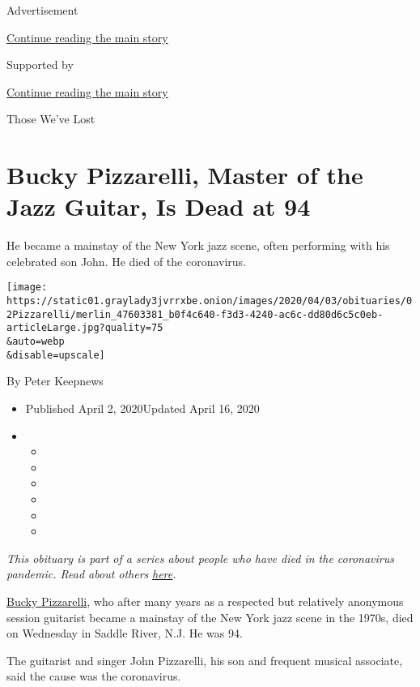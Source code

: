 Advertisement

\protect\hyperlink{after-top}{Continue reading the main story}

Supported by

\protect\hyperlink{after-sponsor}{Continue reading the main story}

Those We've Lost

\hypertarget{bucky-pizzarelli-master-of-the-jazz-guitar-is-dead-at-94}{%
\section{Bucky Pizzarelli, Master of the Jazz Guitar, Is Dead at
94}\label{bucky-pizzarelli-master-of-the-jazz-guitar-is-dead-at-94}}

He became a mainstay of the New York jazz scene, often performing with
his celebrated son John. He died of the coronavirus.

\texttt{[image: https://static01.graylady3jvrrxbe.onion/images/2020/04/03/obituaries/02Pizzarelli/merlin\_47603381\_b0f4c640-f3d3-4240-ac6c-dd80d6c5c0eb-articleLarge.jpg?quality=75\\\&auto=webp\\\&disable=upscale]}

By Peter Keepnews

\begin{itemize}
\item
  Published April 2, 2020Updated April 16, 2020
\item
  \begin{itemize}
  \item
  \item
  \item
  \item
  \item
  \item
  \end{itemize}
\end{itemize}

\emph{This obituary is part of a series about people who have died in
the coronavirus pandemic. Read about others}
\href{https://www.nytimes3xbfgragh.onion/series/people-who-have-died-of-the-coronavirus}{\emph{here}}\emph{.}

\href{https://www.youtube.com/watch?v=goDqtP4MtqQ}{Bucky Pizzarelli},
who after many years as a respected but relatively anonymous session
guitarist became a mainstay of the New York jazz scene in the 1970s,
died on Wednesday in Saddle River, N.J. He was 94.

The guitarist and singer John Pizzarelli, his son and frequent musical
associate, said the cause was the coronavirus.

